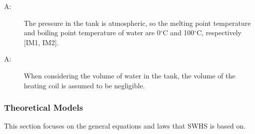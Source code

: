 \documentclass[12pt]{article}
\newcounter{assumpnum}
\newcommand{\atheassumpnum}{A\theassumpnum}
\begin{document}
\begin{description}
\item[\atheassumpnum\label{A:Atmospheric-Pressure-Tank}:]The pressure in the tank is atmospheric, so the melting point temperature and boiling point temperature of water are 0${}^{\circ}$C and 100${}^{\circ}$C, respectively {[}IM1, IM2{]}.
\end{description}
\begin{description}
\item[\atheassumpnum\label{A:Volume-Coil-Negligible}:]When considering the volume of water in the tank, the volume of the heating coil is assumed to be negligible.
\end{description}
\subsubsection{Theoretical Models}
\label{Sec:TMs}
This section focuses on the general equations and laws that SWHS is based on.
~\newline
\end{document}
